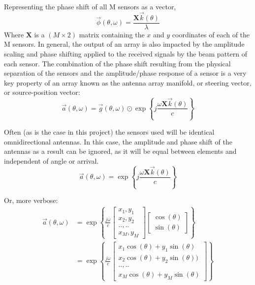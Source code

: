 Representing the phase shift of all M sensors as a vector,
\begin{equation}
  \vec{\phi}(\theta, \omega) = \frac{\mathbf{X}\vec{k}(\theta)}{\lambda}
\end{equation}
Where \(\mathbf{X}\) is a \((M \times 2)\) matrix containing the \(x\) and \(y\) coordinates of each of the M sensors. 
In general, the output of an array is also impacted by the amplitude scaling and phase shifting applied to the received signals by the beam pattern of each sensor. The combination of the phase shift resulting from the physical separation of the sensors and the amplitude/phase response of a sensor is a very key property of an array known as the antenna array manifold, or steering vector, or source-position vector:
\begin{equation}
  \boxed{
    \vec{a}(\theta, \omega) = \vec{g}(\theta, \omega) \odot \exp \left\{ j \frac{\omega \mathbf{X} \vec{k}(\theta)}{c} \right\}
  }
\end{equation}

Often (as is the case in this project) the sensors used will be identical omnidirectional antennas. In this case, the amplitude and phase shift of the antennas as a result can be ignored, as it will be equal between elements and independent of angle or arrival. 
\begin{equation}
  \vec{a}(\theta, \omega) = \exp \left\{ j \frac{\omega \mathbf{X} \vec{k}(\theta)}{c} \right\}
\end{equation}

Or, more verbose:
\begin{align}
\vec{a}(\theta, \omega) &= \exp \left\{ \frac{j \omega}{c} \begin{bmatrix} x_1, y_1 \\ x_2, y_2 \\ .., .. \\ x_M, y_M \end{bmatrix} \begin{bmatrix} \cos(\theta) \\ \sin(\theta) \end{bmatrix} \right\} \\
                        &= \exp \left\{ \frac{j \omega}{c} \begin{bmatrix} x_1\cos(\theta) + y_1\sin(\theta) \\ x_2\cos(\theta) + y_2\sin(\theta)) \\ .., .. \\ x_M\cos(\theta) + y_M\sin(\theta) \end{bmatrix} \right\} \\
\end{align}

